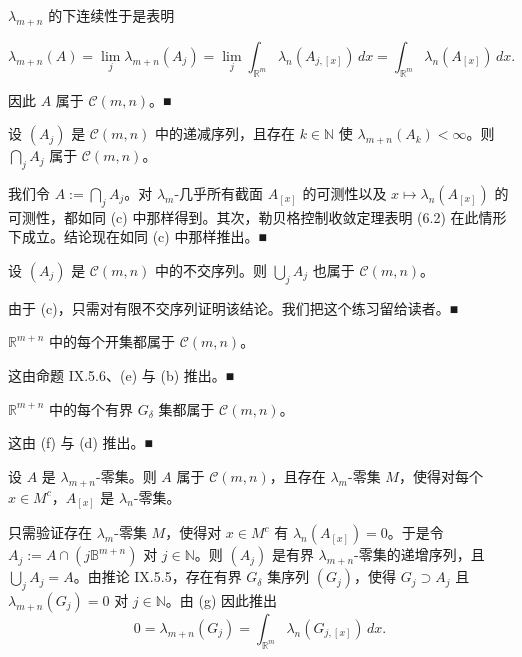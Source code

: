 \begin{remark}
\begin{items}
\begin{subitems}
$ \lambda_{m+n} $ 的下连续性于是表明

\[
\lambda_{m+n}(A) = \lim_j \lambda_{m+n}(A_j) = \lim_j \int_{\mathbb{R}^m} \lambda_n(A_{j,[x]}) \, dx = \int_{\mathbb{R}^m} \lambda_n(A_{[x]}) \, dx .
\]

因此 $ A $ 属于 $ \mathcal{C}(m, n) $。\nobreak\hspace{0.35em}■

\end{subitems}

\item[（d）]

设 $ (A_j) $ 是 $ \mathcal{C}(m, n) $ 中的递减序列，且存在 $ k \in \mathbb{N} $ 使 $ \lambda_{m+n}(A_k) < \infty $。则 $ \bigcap_j A_j $ 属于 $ \mathcal{C}(m, n) $。

\proofhead
我们令 $ A := \bigcap_j A_j $。对 $ \lambda_m $-几乎所有截面 $ A_{[x]} $ 的可测性以及 $ x \mapsto \lambda_n(A_{[x]}) $ 的可测性，都如同 (c) 中那样得到。其次，勒贝格控制收敛定理表明 (6.2) 在此情形下成立。结论现在如同 (c) 中那样推出。\nobreak\hspace{0.35em}■
\item[（e）]

设 $ (A_j) $ 是 $ \mathcal{C}(m, n) $ 中的不交序列。则 $ \bigcup_j A_j $ 也属于 $ \mathcal{C}(m, n) $。

\proofhead
由于 (c)，只需对有限不交序列证明该结论。我们把这个练习留给读者。\nobreak\hspace{0.35em}■
\item[（f）]

$ \mathbb{R}^{m+n} $ 中的每个开集都属于 $ \mathcal{C}(m, n) $。

\proofhead
这由命题 IX.5.6、(e) 与 (b) 推出。\nobreak\hspace{0.35em}■
\item[（g）]

$ \mathbb{R}^{m+n} $ 中的每个有界 $ G_\delta $ 集都属于 $ \mathcal{C}(m, n) $。

\proofhead
这由 (f) 与 (d) 推出。\nobreak\hspace{0.35em}■
\item[（h）]

设 $ A $ 是 $ \lambda_{m+n} $-零集。则 $ A $ 属于 $ \mathcal{C}(m, n) $，且存在 $ \lambda_m $-零集 $ M $，使得对每个 $ x \in M^{c} $，$ A_{[x]} $ 是 $ \lambda_n $-零集。

\proofhead
只需验证存在 $ \lambda_m $-零集 $ M $，使得对 $ x \in M^{c} $ 有 $ \lambda_n(A_{[x]}) = 0 $。于是令 $ A_j := A \cap (j \mathbb{B}^{m+n}) $ 对 $ j \in \mathbb{N} $。则 $ (A_j) $ 是有界 $ \lambda_{m+n} $-零集的递增序列，且 $ \bigcup_j A_j = A $。由推论 IX.5.5，存在有界 $ G_\delta $ 集序列 $ (G_j) $，使得 $ G_j \supset A_j $ 且 $ \lambda_{m+n}(G_j) = 0 $ 对 $ j \in \mathbb{N} $。由 (g) 因此推出
\[
0 = \lambda_{m+n}(G_j) = \int_{\mathbb{R}^m} \lambda_n(G_{j,[x]}) \, dx .
\]


\end{items}
\end{remark}
